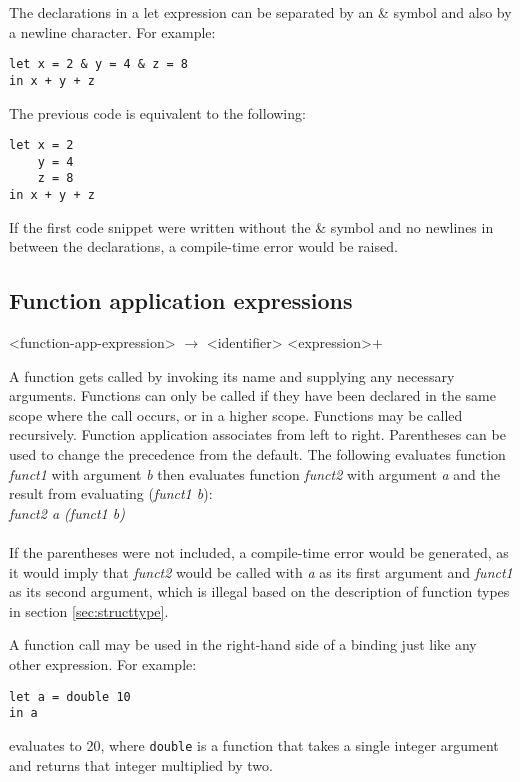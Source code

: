 The declarations in a let expression can be separated by an \& symbol and also by a newline character. For example:

\begin{verbatim}
let x = 2 & y = 4 & z = 8 
in x + y + z
\end{verbatim}

The previous code is equivalent to the following:

\begin{verbatim}
let x = 2
    y = 4
    z = 8
in x + y + z
\end{verbatim}

If the first code snippet were written without the \& symbol and no newlines in between the
declarations, a compile-time error would be raised.

\subsection{Function application expressions}

\begin{grammar}
<function-app-expression> $\rightarrow$ <identifier> <expression>+
\end{grammar}

A function gets called by invoking its name and supplying any necessary arguments. 
Functions can only be called if they have been declared in the same scope where the call occurs,
or in a higher scope. Functions may be called recursively. Function application associates 
from left to right. Parentheses can be used to change the precedence from the default.
The following evaluates function \emph{funct1} with argument \emph{b} then evaluates function
\emph{funct2} with argument \emph{a} and the result from evaluating (\emph{funct1 b}): \\
    
    \emph{funct2 a (funct1 b)}\\ \\
If the parentheses were not included, a compile-time error would be generated, as it would imply
that \emph{funct2} would be called with \emph{a} as
its first argument and \emph{funct1} as its second argument, which is illegal based on the description
of function types in section \ref{sec:structtype}.

A function call may be used in the right-hand side of a binding just like any other expression. 
For example:
\begin{verbatim}
let a = double 10 
in a
\end{verbatim}
evaluates to 20, where \texttt{double} is a function that takes a single integer argument and
returns that integer multiplied by two. 

